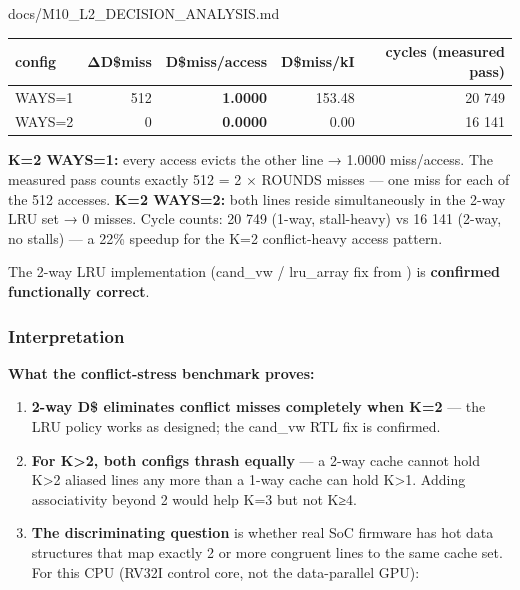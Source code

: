 \begin{relocated}{docs/M10_L2_DECISION_ANALYSIS.md}
{
\begin{longtable}[]{@{}lrrrr@{}}
\toprule\noalign{}
config & ΔD\$miss & D\$miss/\allowbreak{}access & D\$miss/kI & cycles
(measured pass) \\
\midrule\noalign{}
\endhead
\bottomrule\noalign{}
\endlastfoot
WAYS=1 & 512 & \textbf{1.0000} & 153.48 & 20 749 \\
WAYS=2 & 0 & \textbf{0.0000} & 0.00 & 16 141 \\
\end{longtable}
}

\textbf{K=2 WAYS=1:} every access evicts the other line → 1.0000
miss/\allowbreak{}access. The measured pass counts exactly 512 = 2 ×
ROUNDS misses --- one miss for each of the 512 accesses. \textbf{K=2
WAYS=2:} both lines reside simultaneously in the 2-way LRU set → 0
misses. Cycle counts: 20 749 (1-way, stall-heavy) vs 16 141 (2-way, no
stalls) --- a 22\% speedup for the K=2 conflict-heavy access pattern.

The 2-way LRU implementation (cand\_vw / lru\_array fix from
) is \textbf{confirmed functionally
correct}.

\subsubsection{Interpretation}\label{tm:dec:m10-l2:73-interpretation}

\textbf{What the conflict-stress benchmark proves:}

\begin{enumerate}
\def\labelenumi{\arabic{enumi}.}
\item
  \textbf{2-way D\$ eliminates conflict misses completely when K=2} ---
  the LRU policy works as designed; the cand\_vw RTL fix is confirmed.
\item
  \textbf{For K\textgreater2, both configs thrash equally} --- a 2-way
  cache cannot hold K\textgreater2 aliased lines any more than a 1-way
  cache can hold K\textgreater1. Adding associativity beyond 2 would
  help K=3 but not K≥4.
\item
  \textbf{The discriminating question} is whether real SoC firmware has
  hot data structures that map exactly 2 or more congruent lines to the
  same cache set. For this CPU (RV32I control core, not the
  data-parallel GPU):


\end{enumerate}
\end{relocated}
